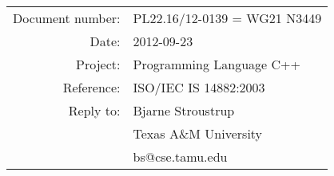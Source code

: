 \documentclass[12pt,letterpaper]{article}
\begin{document}
\thispagestyle{empty}

\begin{multicols}{2}



\begin{tabular}{rl}
Document number:&PL22.16/12-0139 = WG21 N3449\\
Date:           &2012-09-23                  \\
Project:        &Programming Language C++    \\
Reference:      &ISO/IEC IS 14882:2003       \\
Reply to:       &Bjarne Stroustrup           \\
                &Texas A\&M University       \\
                &bs@cse.tamu.edu             \\
\hline
\end{tabular}

\end{multicols}
\end{document}
